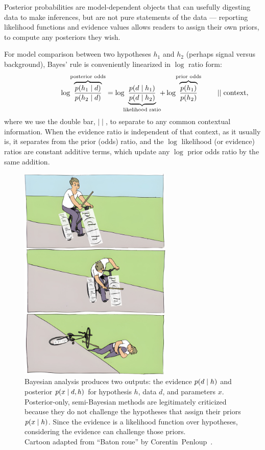 Posterior probabilities are model-dependent objects that can usefully
digesting data to make inferences, but are not pure statements of the data ---
reporting likelihood functions and evidence values allows readers to assign
their own priors, to compute any posteriors they wish.

For model comparison between two hypotheses $h_1$ and $h_2$
(perhaps signal versus background),
Bayes' rule is conveniently linearized in $\log$ ratio form:
\begin{equation}
\label{eqn:searches_log_odds}
\hphantom{\quad \quad \mid\mid \mathrm{context}}
\log\!
\overbrace{
\frac{\prob{h_1}{d}}{\prob{h_2}{d}}
}^\textrm{posterior odds}
=
\log\!\!
\underbrace{
\frac{\prob{d}{h_1}}{\prob{d}{h_2}}
}_\textrm{likelihood ratio}
\!\!
+
\log\!
\overbrace{
\frac{\probc{h_1}}{\probc{h_2}}
}^\textrm{prior odds}
\quad \quad \mid\mid \mathrm{context}
,
\end{equation}
where we use the double bar, $\mid\mid$, to separate to any common contextual
information.
When the evidence ratio is independent of that context, as it usually is,
it separates from the prior (odds) ratio,
and the $\log$ likelihood (or evidence) ratios are constant additive terms,
which update any $\log$ prior odds ratio by the same addition.

\begin{figure}[tp]
\centering
\includegraphics[width=0.65\textwidth]{figures/searches_baton_roue_bayes.jpg}
\caption[
Bayesian analysis produces two outputs: the evidence and posterior
]{%
Bayesian analysis produces two outputs: the
evidence $p(d \mid h)$ and
posterior $p(x \mid d,h)$ for hypothesis $h$, data $d$, and parameters $x$.
Posterior-only, semi-Bayesian methods are legitimately criticized because they
do not challenge the hypotheses that assign their priors $p(x \mid h)$.
Since the evidence is a likelihood function over hypotheses, considering the
evidence can challenge those priors.
\\[0.5em]
Cartoon adapted from ``Baton roue'' by
Corentin~Penloup~\cite{penloup2011baton}.
}
\label{fig:searches_baton_roue_bayes}
\end{figure}

